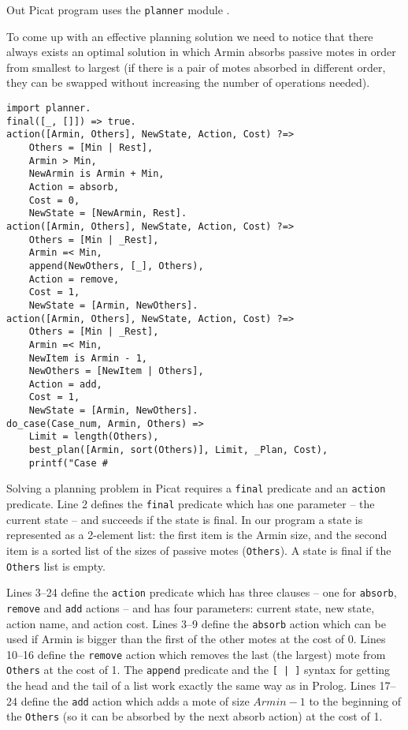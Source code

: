 \documentclass{llncs}
\begin{document}
Out Picat program uses the \texttt{planner} module \cite{zhou2014planning}.

To come up with an effective planning solution we need to notice that there always exists an optimal solution in which Armin absorbs passive motes in order from smallest to largest (if there is a pair of motes absorbed in different order, they can be swapped without increasing the number of operations needed).

\begin{lstlisting}[caption={Picat solution for the ``Osmos'' problem}]
import planner.
final([_, []]) => true.
action([Armin, Others], NewState, Action, Cost) ?=>
    Others = [Min | Rest],
    Armin > Min,
    NewArmin is Armin + Min,
    Action = absorb,
    Cost = 0,
    NewState = [NewArmin, Rest].
action([Armin, Others], NewState, Action, Cost) ?=>
    Others = [Min | _Rest],
    Armin =< Min,
    append(NewOthers, [_], Others),
    Action = remove,
    Cost = 1,
    NewState = [Armin, NewOthers].
action([Armin, Others], NewState, Action, Cost) ?=>
    Others = [Min | _Rest],
    Armin =< Min,
    NewItem is Armin - 1,
    NewOthers = [NewItem | Others],
    Action = add,
    Cost = 1,
    NewState = [Armin, NewOthers].
do_case(Case_num, Armin, Others) =>
    Limit = length(Others),
    best_plan([Armin, sort(Others)], Limit, _Plan, Cost),
    printf("Case #\end{lstlisting}

Solving a planning problem in Picat requires a \texttt{final} predicate and an \texttt{action} predicate.
Line 2 defines the \texttt{final} predicate which has one parameter -- the current state -- and succeeds if the state is final.
In our program a state is represented as a 2-element list: the first item is the Armin size, and the second item is a sorted list of the sizes of passive motes (\texttt{Others}). A state is final if the \texttt{Others} list is empty.

Lines 3--24 define the \texttt{action} predicate which has three clauses -- one for \texttt{absorb}, \texttt{remove} and \texttt{add} actions -- and has four parameters: current state, new state, action name, and action cost.
Lines 3--9 define the \texttt{absorb} action which can be used if Armin is bigger than the first of the other motes at the cost of 0.
Lines 10--16 define the \texttt{remove} action which removes the last (the largest) mote from \texttt{Others} at the cost of 1.
The \texttt{append} predicate and the \texttt{[ | ]} syntax for getting the head and the tail of a list work exactly the same way as in Prolog.
Lines 17--24 define the \texttt{add} action which adds a mote of size $Armin - 1$ to the beginning of the \texttt{Others}
(so it can be absorbed by the next absorb action) at the cost of 1.
\end{document}
